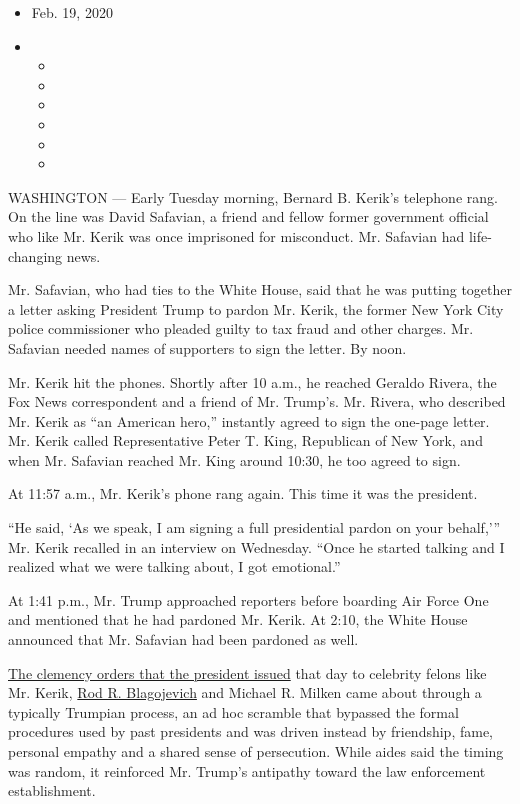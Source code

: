 \begin{itemize}
\item
  Feb. 19, 2020
\item
  \begin{itemize}
  \item
  \item
  \item
  \item
  \item
  \item
  \end{itemize}
\end{itemize}

WASHINGTON --- Early Tuesday morning, Bernard B. Kerik's telephone rang.
On the line was David Safavian, a friend and fellow former government
official who like Mr. Kerik was once imprisoned for misconduct. Mr.
Safavian had life-changing news.

Mr. Safavian, who had ties to the White House, said that he was putting
together a letter asking President Trump to pardon Mr. Kerik, the former
New York City police commissioner who pleaded guilty to tax fraud and
other charges. Mr. Safavian needed names of supporters to sign the
letter. By noon.

Mr. Kerik hit the phones. Shortly after 10 a.m., he reached Geraldo
Rivera, the Fox News correspondent and a friend of Mr. Trump's. Mr.
Rivera, who described Mr. Kerik as ``an American hero,'' instantly
agreed to sign the one-page letter. Mr. Kerik called Representative
Peter T. King, Republican of New York, and when Mr. Safavian reached Mr.
King around 10:30, he too agreed to sign.

At 11:57 a.m., Mr. Kerik's phone rang again. This time it was the
president.

``He said, `As we speak, I am signing a full presidential pardon on your
behalf,''' Mr. Kerik recalled in an interview on Wednesday. ``Once he
started talking and I realized what we were talking about, I got
emotional.''

At 1:41 p.m., Mr. Trump approached reporters before boarding Air Force
One and mentioned that he had pardoned Mr. Kerik. At 2:10, the White
House announced that Mr. Safavian had been pardoned as well.

\href{https://www.nytimes.com/2020/02/18/us/politics/trump-pardon-blagojevich-debartolo.html?action=click\&module=Top\%20Stories\&pgtype=Homepage}{The
clemency orders that the president issued} that day to celebrity felons
like Mr. Kerik,
\href{https://www.nytimes.com/2020/02/18/us/politics/trump-pardon-blagojevich-debartolo.html?action=click\&module=Top\%20Stories\&pgtype=Homepage}{Rod
R. Blagojevich} and Michael R. Milken came about through a typically
Trumpian process, an ad hoc scramble that bypassed the formal procedures
used by past presidents and was driven instead by friendship, fame,
personal empathy and a shared sense of persecution. While aides said the
timing was random, it reinforced Mr. Trump's antipathy toward the law
enforcement establishment.

